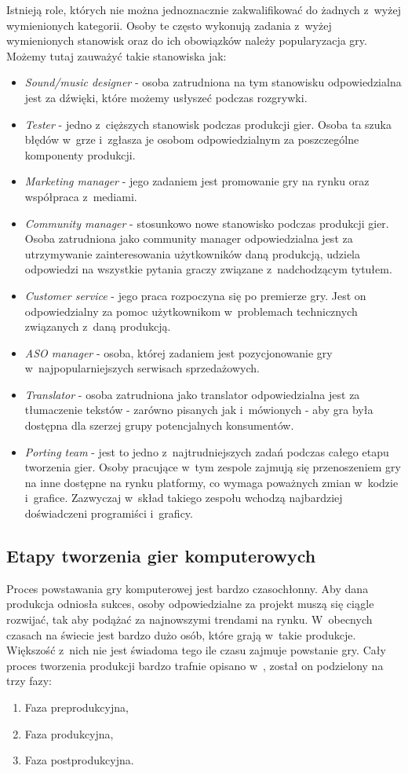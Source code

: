\documentclass[12pt,a4paper,oneside]{book}
\theoremstyle{definition}
\numberwithin{equation}{chapter}
\begin{document}
\par Istnieją role, których nie można jednoznacznie zakwalifikować do żadnych z~wyżej wymienionych kategorii. Osoby te często wykonują zadania z~wyżej wymienionych stanowisk oraz do ich obowiązków należy popularyzacja gry. Możemy tutaj zauważyć takie stanowiska jak: 
\begin{itemize}
    \item \textit{Sound/music designer} - osoba zatrudniona na tym stanowisku odpowiedzialna jest za dźwięki, które możemy usłyszeć podczas rozgrywki.
    \item \textit{Tester} - jedno z~cięższych stanowisk podczas produkcji gier. Osoba ta szuka błędów w~grze i~zgłasza je osobom odpowiedzialnym za poszczególne komponenty produkcji.
    \item \textit{Marketing manager} - jego zadaniem jest promowanie gry na rynku oraz współpraca z~mediami.
    \item \textit{Community manager} - stosunkowo nowe stanowisko podczas produkcji gier. Osoba zatrudniona jako community manager odpowiedzialna jest za utrzymywanie zainteresowania użytkowników daną produkcją, udziela odpowiedzi na wszystkie pytania graczy związane z~nadchodzącym tytułem.
    \item \textit{Customer service} - jego praca rozpoczyna się po premierze gry. Jest on odpowiedzialny za pomoc użytkownikom w~problemach technicznych związanych z~daną produkcją.
    \item \textit{ASO manager} - osoba, której zadaniem jest pozycjonowanie gry w~najpopularniejszych serwisach sprzedażowych.
    \item \textit{Translator} - osoba zatrudniona jako translator odpowiedzialna jest za tłumaczenie tekstów - zarówno pisanych jak i~mówionych - aby gra była dostępna dla szerzej grupy potencjalnych konsumentów.
    \item \textit{Porting team} - jest to jedno z~najtrudniejszych zadań podczas całego etapu tworzenia gier. Osoby pracujące w~tym zespole zajmują się przenoszeniem gry na inne dostępne na rynku platformy, co wymaga poważnych zmian w~kodzie i~grafice. Zazwyczaj w~skład takiego zespołu wchodzą najbardziej doświadczeni programiści i~graficy.
\end{itemize}
\subsection{Etapy tworzenia gier komputerowych}
\par Proces powstawania gry komputerowej jest bardzo czasochłonny. Aby dana produkcja odniosła sukces, osoby odpowiedzialne za projekt muszą się ciągle rozwijać, tak aby podążać za najnowszymi trendami na rynku. W~obecnych czasach na świecie jest bardzo dużo osób, które grają w~takie produkcje. Większość z~nich nie jest świadoma tego ile czasu zajmuje powstanie gry. Cały proces tworzenia produkcji bardzo trafnie opisano w~\cite{KompendiumProd}, został on podzielony na trzy fazy:
\begin{enumerate}
    \item Faza preprodukcyjna,
    \item Faza produkcyjna,
    \item Faza postprodukcyjna.
\end{enumerate}
\end{document}
